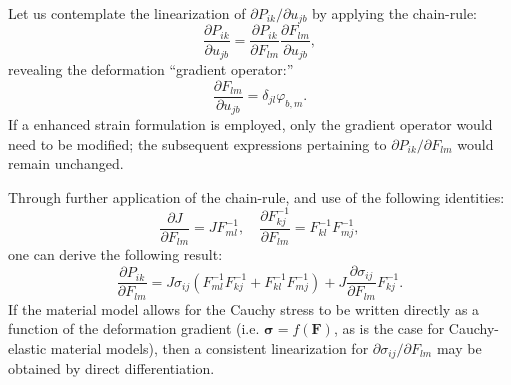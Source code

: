 	Let us contemplate the linearization of $\partial P_{ik} / \partial u_{jb}$ by applying the chain-rule:
	\begin{equation}
		\frac{\partial P_{ik}}{\partial u_{jb}} = \frac{\partial P_{ik}}{\partial F_{lm}} \frac{\partial F_{lm}}{\partial u_{jb}},
	\end{equation}
	revealing the deformation ``gradient operator:''
	\begin{equation}
		\frac{\partial F_{lm}}{\partial u_{jb}} = \delta_{jl} \varphi_{b,m}.
	\end{equation}
	If a enhanced strain formulation is employed, only the gradient operator would need to be modified; the subsequent expressions pertaining to $\partial P_{ik} / \partial F_{lm}$ would remain unchanged.

	
	Through further application of the chain-rule, and use of the following identities:
	\begin{equation}
		\frac{\partial J}{\partial F_{lm}} = J F_{ml}^{-1}, \quad \frac{\partial F_{kj}^{-1}}{\partial F_{lm}} = F_{kl}^{-1} F_{mj}^{-1},
	\end{equation}
	one can derive the following result:
	\begin{equation}
		\frac{\partial P_{ik}}{\partial F_{lm}} = J \sigma_{ij} (F_{ml}^{-1} F_{kj}^{-1} + F_{kl}^{-1} F_{mj}^{-1})  + J \frac{\partial \sigma_{ij}}{\partial F_{lm}} F_{kj}^{-1}.
	\end{equation}
	If the material model allows for the Cauchy stress to be written directly as a function of the deformation gradient (i.e. $\boldsymbol{\sigma} = f(\mathbf{F})$, as is the case for Cauchy-elastic material models), then a consistent linearization for $\partial \sigma_{ij} / \partial F_{lm}$ may be obtained by direct differentiation.
	
